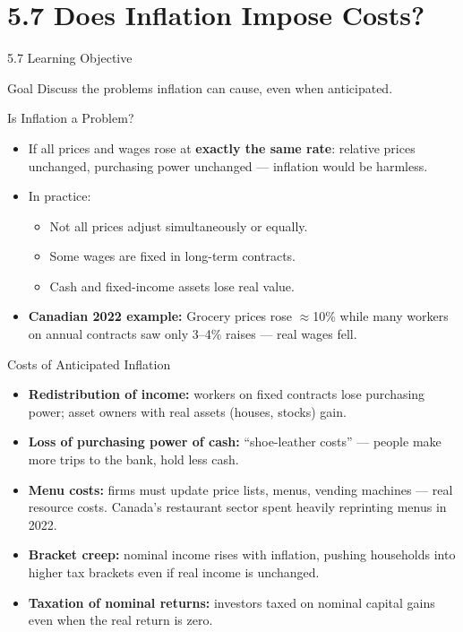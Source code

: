 \documentclass[aspectratio=169]{beamer}
\begin{document}
\section{5.7 Does Inflation Impose Costs?}

\begin{frame}{5.7 Learning Objective}
\transfade
\begin{block}{Goal}
Discuss the problems inflation can cause, even when anticipated.
\end{block}
\end{frame}

\begin{frame}{Is Inflation a Problem?}
\transfade
\begin{itemize}[<+->]
  \item If all prices and wages rose at \textbf{exactly the same rate}: relative prices unchanged, purchasing power unchanged --- inflation would be harmless.
  \item In practice:
  \begin{itemize}[<+->]
    \item Not all prices adjust simultaneously or equally.
    \item Some wages are fixed in long-term contracts.
    \item Cash and fixed-income assets lose real value.
  \end{itemize}
  \item \textbf{Canadian 2022 example:} Grocery prices rose $\approx$10\% while many workers on annual contracts saw only 3--4\% raises --- real wages fell.
\end{itemize}
\end{frame}

\begin{frame}{Costs of Anticipated Inflation}
\transfade
\begin{itemize}[<+->]
  \item \textbf{Redistribution of income:} workers on fixed contracts lose purchasing power; asset owners with real assets (houses, stocks) gain.
  \item \textbf{Loss of purchasing power of cash:} ``shoe-leather costs'' --- people make more trips to the bank, hold less cash.
  \item \textbf{Menu costs:} firms must update price lists, menus, vending machines --- real resource costs. Canada's restaurant sector spent heavily reprinting menus in 2022.
  \item \textbf{Bracket creep:} nominal income rises with inflation, pushing households into higher tax brackets even if real income is unchanged.
  \item \textbf{Taxation of nominal returns:} investors taxed on nominal capital gains even when the real return is zero.
\end{itemize}
\end{frame}
\end{document}

